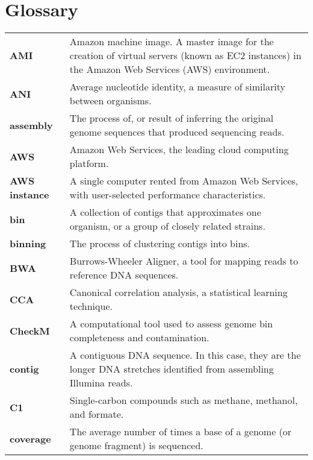 \chapter*{Glossary} %
\renewcommand*{\arraystretch}{1.4} %

\begin{singlespace}
\begin{longtable}{ p{}  p{} }

\textbf{AMI} & Amazon machine image.  A master image for the creation of virtual servers (known as EC2 instances)
                in the Amazon Web Services (AWS) environment. \\
\textbf{ANI} & Average nucleotide identity, a measure of similarity between organisms. \\
\textbf{assembly} &  The process of, or result of inferring the original genome sequences that produced sequencing reads. \\
\textbf{AWS} & Amazon Web Services, the leading cloud computing platform. \\
\textbf{AWS instance} & A single computer rented from Amazon Web Services, with user-selected performance characteristics. \\
\textbf{bin} & A collection of contigs that approximates one organism, or a group of closely related strains. \\
\textbf{binning} &  The process of clustering contigs into bins.  \\ %
\textbf{BWA} & Burrows-Wheeler Aligner, a tool for mapping reads to reference DNA sequences. \\
\textbf{CCA} & Canonical correlation analysis, a statistical learning technique. \\
\textbf{CheckM} &  A computational tool used to assess genome bin completeness and contamination. \\
\textbf{contig} & A contiguous DNA sequence.  In this case, they are the longer DNA stretches identified from assembling Illumina reads. \\
\textbf{C1} & Single-carbon compounds such as methane, methanol, and formate. \\
\textbf{coverage} & The average number of times a base of a genome (or genome fragment) is sequenced.  \\

\end{longtable}
\end{singlespace}
